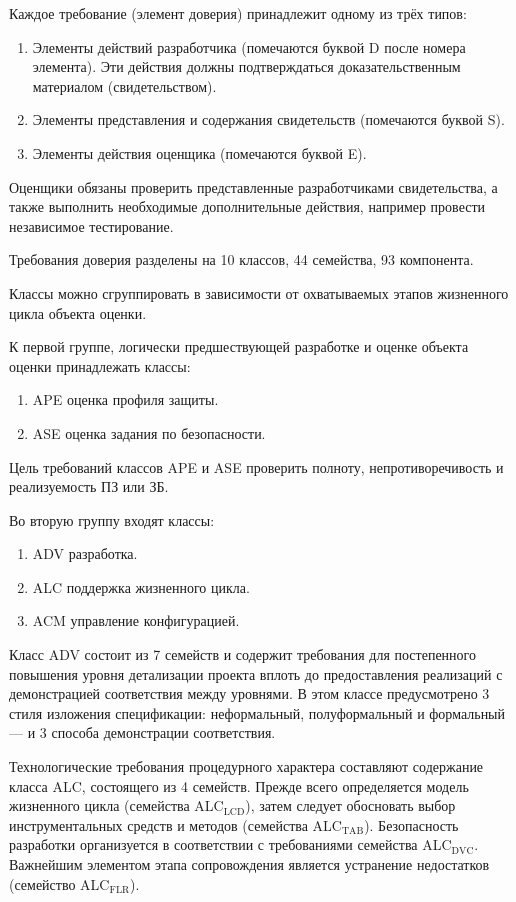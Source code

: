 \documentclass[12pt, russian, oneside, article]{ncc}
\begin{document}
Каждое требование (элемент доверия) принадлежит одному из трёх типов:
\begin{enumerate}
\item Элементы действий разработчика (помечаются буквой D после номера элемента). Эти действия должны подтверждаться доказательственным материалом (свидетельством).
\item Элементы представления и содержания свидетельств (помечаются буквой S).
\item Элементы действия оценщика (помечаются буквой E).
\end{enumerate}

Оценщики обязаны проверить представленные разработчиками свидетельства, а также выполнить необходимые дополнительные действия, например провести независимое тестирование.

Требования доверия разделены на 10 классов, 44 семейства, 93 компонента.

Классы можно сгруппировать в зависимости от охватываемых этапов жизненного цикла объекта оценки.

К первой группе, логически предшествующей разработке и оценке объекта оценки принадлежать классы:
\begin{enumerate}
\item APE оценка профиля защиты.
\item ASE оценка задания по безопасности.
\end{enumerate}

Цель требований классов APE и ASE проверить полноту, непротиворечивость и реализуемость ПЗ или ЗБ.

Во вторую группу входят классы:
\begin{enumerate}
\item ADV разработка.
\item ALC поддержка жизненного цикла.
\item ACM управление конфигурацией.
\end{enumerate}

Класс ADV состоит из 7 семейств и содержит требования для постепенного повышения уровня детализации проекта вплоть до предоставления реализаций с демонстрацией соответствия между уровнями. В этом классе предусмотрено 3 стиля изложения спецификации: неформальный, полуформальный и формальный --- и 3 способа демонстрации соответствия.

Технологические требования процедурного характера составляют содержание класса ALC, состоящего из 4 семейств. Прежде всего определяется модель жизненного цикла (семейства ALC$_{\mathrm{LCD}}$), затем следует обосновать выбор инструментальных средств и методов (семейства ALC$_{\mathrm{TAB}}$). Безопасность разработки организуется в соответствии с требованиями семейства ALC$_{\mathrm{DVC}}$.
Важнейшим элементом этапа сопровождения является устранение недостатков (семейство ALC$_{\mathrm{FLR}}$). 
\end{document}
